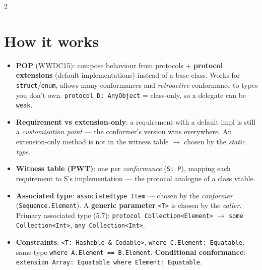 \documentclass[8pt]{extarticle}
\begin{document}



\begin{multicols}{2}
\raggedright

\section{How it works}
\begin{itemize}
  \item \textbf{POP} (WWDC15): compose behaviour from protocols + \textbf{protocol extensions}
        (default implementations) instead of a base class. Works for \texttt{struct}/\texttt{enum},
        allows many conformances and \emph{retroactive} conformance to types you don't own.
        \texttt{protocol D: AnyObject} = class-only, so a delegate can be \texttt{weak}.
  \item \textbf{Requirement vs extension-only}: a requirement with a default impl is still a
        \emph{customisation point} — the conformer's version wins everywhere. An extension-only
        method is not in the witness table $\to$ chosen by the \emph{static type}.
  \item \textbf{Witness table (PWT)}: one per \emph{conformance} (\texttt{S: P}), mapping each
        requirement to S's implementation — the protocol analogue of a class vtable.
  \item \textbf{Associated type}: \texttt{associatedtype Item} — chosen by the \emph{conformer}
        (\texttt{Sequence.Element}). A \textbf{generic parameter} \texttt{<T>} is chosen by the
        \emph{caller}. Primary associated type (5.7): \texttt{protocol Collection<Element>} $\to$
        \texttt{some Collection<Int>}, \texttt{any Collection<Int>}.
  \item \textbf{Constraints}: \texttt{<T: Hashable \& Codable>}, \texttt{where C.Element: Equatable},
        same-type \texttt{where A.Element == B.Element}. \textbf{Conditional conformance}:
        \texttt{extension Array: Equatable where Element: Equatable}.

\end{itemize}
\end{multicols}
\end{document}
